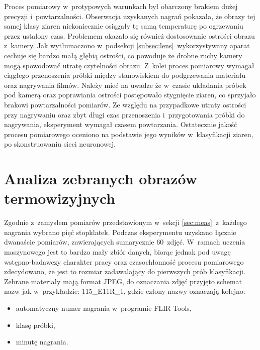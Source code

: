 Proces pomiarowy w~protypowych warunkach był obarczony brakiem dużej precyzji
i~powtarzalności.
Obserwacja uzyskanych nagrań pokazała, że obrazy tej samej klasy ziaren
niekoniecznie osiągały tę samą temperaturę po ogrzewaniu przez ustalony czas.
Problemem okazało się również dostosowanie ostrości obrazu z~kamery.
Jak wytłumaczono w~podsekcji \ref{subsec:lens}~wykorzystywany aparat cechuje
się bardzo małą głębią ostrości, co powoduje że drobne ruchy kamery
mogą spowodować utratę czytelności obrazu.
Z~kolei proces pomiarowy wymagał ciągłego przenoszenia próbki między
stanowiskiem do podgrzewania materiału oraz nagrywania filmów.
Należy mieć na uwadze że w~czasie układania próbek pod kamerą oraz poprawiania
ostrości postępowało stygnięcie ziaren, co sprzyjało brakowi powtarzalności
pomiarów.
Ze względu na przypadkowe utraty ostrości przy nagrywaniu oraz zbyt długi czas
przenoszenia i~przygotowania próbki do nagrywania, eksperyment wymagał czasem
powtarzania.
Ostatecznie jakość procesu pomiarowego oceniono na podstawie jego wyników
w~klasyfikacji ziaren, po skonstruowaniu sieci neuronowej.

\section{Analiza zebranych obrazów termowizyjnych}
Zgodnie z~zamysłem pomiarów przedstawionym w~sekcji \ref{sec:meas}~z~każdego
nagrania wybrano pięć stopklatek.
Podczas eksperymentu uzyskano łącznie dwanaście pomiarów, zawierających
sumarycznie 60~zdjęć.
W~ramach uczenia maszynowego jest to bardzo mały zbiór danych, biorąc jednak
pod uwagę wstępno-badawczy charakter pracy oraz czasochłonność procesu 
pomiarowego zdecydowano, że jest to rozmiar zadawalający do pierwszych
prób klasyfikacji.
Zebrane materiały mają format JPEG, do oznaczania zdjęć przyjęto schemat
nazw jak w~przykładzie: 115\_E11R\_1, gdzie człony nazwy oznaczają kolejno:
\begin{itemize}
	\item automatyczny numer nagrania w~programie FLIR Tools,
	\item klasę próbki,
	\item minutę nagrania.
\end{itemize}

